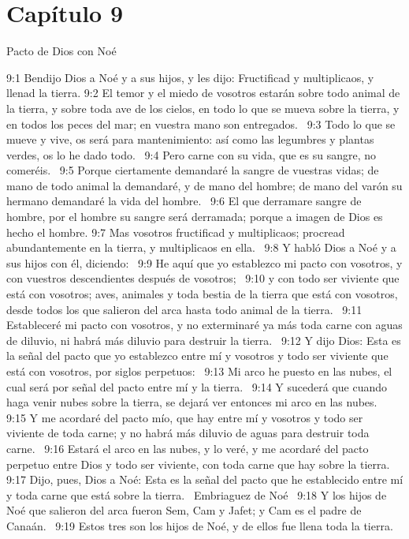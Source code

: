 \section*{Capítulo 9}
Pacto de Dios con Noé  

9:1 Bendijo Dios a Noé y a sus hijos, y les dijo: Fructificad y multiplicaos, y llenad la tierra. 
9:2 El temor y el miedo de vosotros estarán sobre todo animal de la tierra, y sobre toda ave de los cielos, en todo lo que se mueva sobre la tierra, y en todos los peces del mar; en vuestra mano son entregados.  
9:3 Todo lo que se mueve y vive, os será para mantenimiento: así como las legumbres y plantas verdes, os lo he dado todo.  
9:4 Pero carne con su vida, que es su sangre, no comeréis.  
9:5 Porque ciertamente demandaré la sangre de vuestras vidas; de mano de todo animal la demandaré, y de mano del hombre; de mano del varón su hermano demandaré la vida del hombre.  
9:6 El que derramare sangre de hombre, por el hombre su sangre será derramada; porque a imagen de Dios es hecho el hombre. 
9:7 Mas vosotros fructificad y multiplicaos; procread abundantemente en la tierra, y multiplicaos en ella.  
9:8 Y habló Dios a Noé y a sus hijos con él, diciendo:  
9:9 He aquí que yo establezco mi pacto con vosotros, y con vuestros descendientes después de vosotros;  
9:10 y con todo ser viviente que está con vosotros; aves, animales y toda bestia de la tierra que está con vosotros, desde todos los que salieron del arca hasta todo animal de la tierra.  
9:11 Estableceré mi pacto con vosotros, y no exterminaré ya más toda carne con aguas de diluvio, ni habrá más diluvio para destruir la tierra.  
9:12 Y dijo Dios: Esta es la señal del pacto que yo establezco entre mí y vosotros y todo ser viviente que está con vosotros, por siglos perpetuos:  
9:13 Mi arco he puesto en las nubes, el cual será por señal del pacto entre mí y la tierra.  
9:14 Y sucederá que cuando haga venir nubes sobre la tierra, se dejará ver entonces mi arco en las nubes.  
9:15 Y me acordaré del pacto mío, que hay entre mí y vosotros y todo ser viviente de toda carne; y no habrá más diluvio de aguas para destruir toda carne.  
9:16 Estará el arco en las nubes, y lo veré, y me acordaré del pacto perpetuo entre Dios y todo ser viviente, con toda carne que hay sobre la tierra. 
9:17 Dijo, pues, Dios a Noé: Esta es la señal del pacto que he establecido entre mí y toda carne que está sobre la tierra.  
Embriaguez de Noé  
9:18 Y los hijos de Noé que salieron del arca fueron Sem, Cam y Jafet; y Cam es el padre de Canaán.  
9:19 Estos tres son los hijos de Noé, y de ellos fue llena toda la tierra.  
